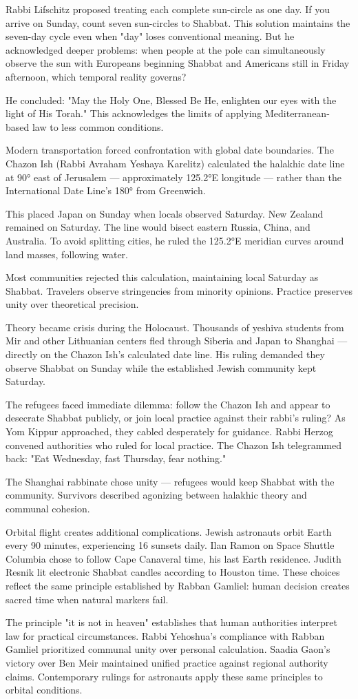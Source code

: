 Rabbi Lifschitz proposed treating each complete sun-circle as one day. If you arrive on Sunday, count seven sun-circles to Shabbat. This solution maintains the seven-day cycle even when "day" loses conventional meaning. But he acknowledged deeper problems: when people at the pole can simultaneously observe the sun with Europeans beginning Shabbat and Americans still in Friday afternoon, which temporal reality governs?

He concluded: "May the Holy One, Blessed Be He, enlighten our eyes with the light of His Torah." This acknowledges the limits of applying Mediterranean-based law to less common conditions.

Modern transportation forced confrontation with global date boundaries. The Chazon Ish (Rabbi Avraham Yeshaya Karelitz) calculated the halakhic date line at 90° east of Jerusalem — approximately 125.2°E longitude — rather than the International Date Line's 180° from Greenwich.

This placed Japan on Sunday when locals observed Saturday. New Zealand remained on Saturday. The line would bisect eastern Russia, China, and Australia. To avoid splitting cities, he ruled the 125.2°E meridian curves around land masses, following water.

Most communities rejected this calculation, maintaining local Saturday as Shabbat. Travelers observe stringencies from minority opinions. Practice preserves unity over theoretical precision.

Theory became crisis during the Holocaust. Thousands of yeshiva students from Mir and other Lithuanian centers fled through Siberia and Japan to Shanghai — directly on the Chazon Ish's calculated date line. His ruling demanded they observe Shabbat on Sunday while the established Jewish community kept Saturday.

The refugees faced immediate dilemma: follow the Chazon Ish and appear to desecrate Shabbat publicly, or join local practice against their rabbi's ruling? As Yom Kippur approached, they cabled desperately for guidance. Rabbi Herzog convened authorities who ruled for local practice. The Chazon Ish telegrammed back: "Eat Wednesday, fast Thursday, fear nothing."

The Shanghai rabbinate chose unity — refugees would keep Shabbat with the community. Survivors described agonizing between halakhic theory and communal cohesion. 

Orbital flight creates additional complications. Jewish astronauts orbit Earth every 90 minutes, experiencing 16 sunsets daily. Ilan Ramon on Space Shuttle Columbia chose to follow Cape Canaveral time, his last Earth residence. Judith Resnik lit electronic Shabbat candles according to Houston time. These choices reflect the same principle established by Rabban Gamliel: human decision creates sacred time when natural markers fail.

The principle "it is not in heaven" establishes that human authorities interpret law for practical circumstances. Rabbi Yehoshua's compliance with Rabban Gamliel prioritized communal unity over personal calculation. Saadia Gaon's victory over Ben Meir maintained unified practice against regional authority claims. Contemporary rulings for astronauts apply these same principles to orbital conditions.
